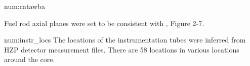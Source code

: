 \begin{numitem}{num:catawba}
  
  Fuel rod axial planes were set to be consistent with \cite{ml033530020},
  Figure 2-7.

\end{numitem}


\begin{numitem}{num:instr_locs}
  The locations of the instrumentation tubes were inferred from \ac{HZP} detector measurement files. There are 58 locations in various locations around the core.
\end{numitem}

